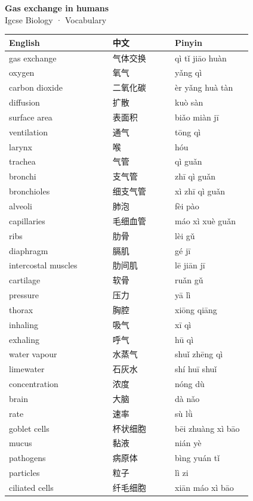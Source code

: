 \documentclass[11pt]{article}
\begin{document}
\begin{center}
  {\LARGE\bfseries Gas exchange in humans}\\[0.35em]
  {\large Igcse Biology · Vocabulary}
\end{center}
\vspace{0.6em}

\begin{longtable}{@{}p{0.40\linewidth}p{0.24\linewidth}p{0.30\linewidth}@{}}
\toprule
\textbf{English} & \textbf{中文} & \textbf{Pinyin} \\
\midrule
\endhead
\bottomrule
\endlastfoot
gas exchange & 气体交换 & qì tǐ jiāo huàn \\
oxygen & 氧气 & yǎng qì \\
carbon dioxide & 二氧化碳 & èr yǎng huà tàn \\
diffusion & 扩散 & kuò sàn \\
surface area & 表面积 & biǎo miàn jī \\
ventilation & 通气 & tōng qì \\
larynx & 喉 & hóu \\
trachea & 气管 & qì guǎn \\
bronchi & 支气管 & zhī qì guǎn \\
bronchioles & 细支气管 & xì zhī qì guǎn \\
alveoli & 肺泡 & fèi pào \\
capillaries & 毛细血管 & máo xì xuè guǎn \\
ribs & 肋骨 & lèi gǔ \\
diaphragm & 膈肌 & gé jī \\
intercostal muscles & 肋间肌 & lē jiān jī \\
cartilage & 软骨 & ruǎn gǔ \\
pressure & 压力 & yā lì \\
thorax & 胸腔 & xiōng qiāng \\
inhaling & 吸气 & xī qì \\
exhaling & 呼气 & hū qì \\
water vapour & 水蒸气 & shuǐ zhēng qì \\
limewater & 石灰水 & shí huī shuǐ \\
concentration & 浓度 & nóng dù \\
brain & 大脑 & dà nǎo \\
rate & 速率 & sù lǜ \\
goblet cells & 杯状细胞 & bēi zhuàng xì bāo \\
mucus & 黏液 & nián yè \\
pathogens & 病原体 & bìng yuán tǐ \\
particles & 粒子 & lì zi \\
ciliated cells & 纤毛细胞 & xiān máo xì bāo \\
\end{longtable}
\end{document}

